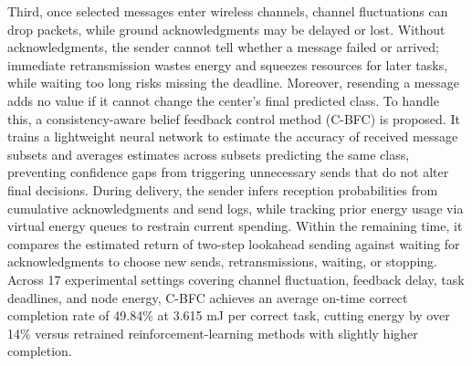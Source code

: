 \begin{eabstract}
\begingroup
{}
Third, once selected messages enter wireless channels, channel fluctuations can drop packets, while ground acknowledgments may be delayed or lost. Without acknowledgments, the sender cannot tell whether a message failed or arrived; immediate retransmission wastes energy and squeezes resources for later tasks, while waiting too long risks missing the deadline. Moreover, resending a message adds no value if it cannot change the center's final predicted class. To handle this, a consistency-aware belief feedback control method (C-BFC) is proposed. It trains a lightweight neural network to estimate the accuracy of received message subsets and averages estimates across subsets predicting the same class, preventing confidence gaps from triggering unnecessary sends that do not alter final decisions. During delivery, the sender infers reception probabilities from cumulative acknowledgments and send logs, while tracking prior energy usage via virtual energy queues to restrain current spending. Within the remaining time, it compares the estimated return of two-step lookahead sending against waiting for acknowledgments to choose new sends, retransmissions, waiting, or stopping. Across 17 experimental settings covering channel fluctuation, feedback delay, task deadlines, and node energy, C-BFC achieves an average on-time correct completion rate of 49.84\% at 3.615 mJ per correct task, cutting energy by over 14\% versus retrained reinforcement-learning methods with slightly higher completion.
\par\endgroup
\end{eabstract}